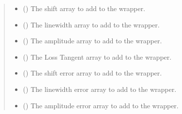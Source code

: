 \documentclass[letterpaper,10pt,english]{sphinxmanual}
\begin{document}
\begin{fulllineitems}
\begin{fulllineitems}
\begin{quote}
\begin{description}
\begin{itemize}
\item {} 
\sphinxAtStartPar
{} (\sphinxstyleliteralemphasis{\sphinxupquote{, }}) \textendash{} The shift array to add to the wrapper.

\item {} 
\sphinxAtStartPar
{} (\sphinxstyleliteralemphasis{\sphinxupquote{, }}) \textendash{} The linewidth array to add to the wrapper.

\item {} 
\sphinxAtStartPar
{} (\sphinxstyleliteralemphasis{\sphinxupquote{, }}) \textendash{} The amplitude array to add to the wrapper.

\item {} 
\sphinxAtStartPar
{} (\sphinxstyleliteralemphasis{\sphinxupquote{, }}) \textendash{} The Loss Tangent array to add to the wrapper.

\item {} 
\sphinxAtStartPar
{} (\sphinxstyleliteralemphasis{\sphinxupquote{, }}) \textendash{} The shift error array to add to the wrapper.

\item {} 
\sphinxAtStartPar
{} (\sphinxstyleliteralemphasis{\sphinxupquote{, }}) \textendash{} The linewidth error array to add to the wrapper.

\item {} 
\sphinxAtStartPar
{} (\sphinxstyleliteralemphasis{\sphinxupquote{, }}) \textendash{} The amplitude error array to add to the wrapper.


\end{itemize}
\end{description}
\end{quote}
\end{fulllineitems}
\end{fulllineitems}
\end{document}

